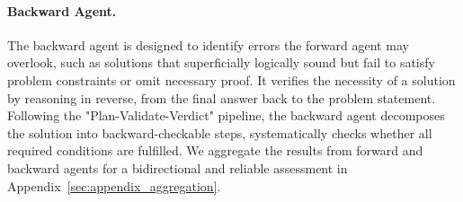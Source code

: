 \documentclass[11pt]{article}
\begin{document}
\paragraph{Backward Agent.}
The backward agent is designed to identify errors the forward agent may overlook, such as solutions that superficially logically sound but fail to satisfy problem constraints or omit necessary proof. It verifies the necessity of a solution by reasoning in reverse, from the final answer back to the problem statement.
Following the "Plan-Validate-Verdict" pipeline, the backward agent decomposes the solution into backward-checkable steps, systematically checks whether all required conditions are fulfilled.
We aggregate the results from forward and backward agents for a bidirectional and reliable assessment in Appendix~\ref{sec:appendix_aggregation}.

    
    

    
\end{document}
